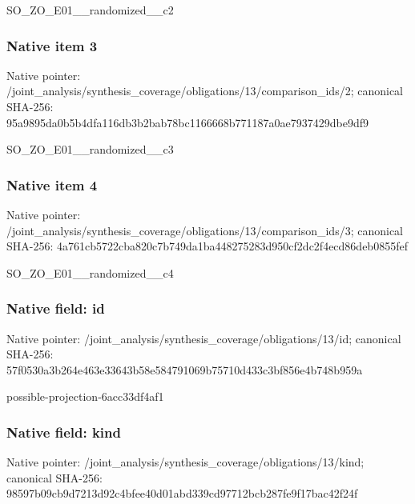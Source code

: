 \documentclass[10pt,a4paper]{article}
\begin{document}
\begingroup\raggedright\sloppy SO\_\allowbreak{}ZO\_\allowbreak{}E01\_\allowbreak{}\_\allowbreak{}randomized\_\allowbreak{}\_\allowbreak{}c2\par\endgroup

\subsubsection{Native item 3}
Native pointer: /joint\_\allowbreak{}analysis/synthesis\_\allowbreak{}coverage/obligations/13/comparison\_\allowbreak{}ids/2; canonical SHA-256: 95a9895da0b5b4dfa116db3b2bab78bc1166668b771187a0ae7937429dbe9df9

\begingroup\raggedright\sloppy SO\_\allowbreak{}ZO\_\allowbreak{}E01\_\allowbreak{}\_\allowbreak{}randomized\_\allowbreak{}\_\allowbreak{}c3\par\endgroup

\subsubsection{Native item 4}
Native pointer: /joint\_\allowbreak{}analysis/synthesis\_\allowbreak{}coverage/obligations/13/comparison\_\allowbreak{}ids/3; canonical SHA-256: 4a761cb5722cba820c7b749da1ba448275283d950cf2dc2f4ecd86deb0855fef

\begingroup\raggedright\sloppy SO\_\allowbreak{}ZO\_\allowbreak{}E01\_\allowbreak{}\_\allowbreak{}randomized\_\allowbreak{}\_\allowbreak{}c4\par\endgroup

\subsubsection{Native field: id}
Native pointer: /joint\_\allowbreak{}analysis/synthesis\_\allowbreak{}coverage/obligations/13/id; canonical SHA-256: 57f0530a3b264e463e33643b58e584791069b75710d433c3bf856e4b748b959a

\begingroup\raggedright\sloppy possible-projection-6acc33df4af1\par\endgroup

\subsubsection{Native field: kind}
Native pointer: /joint\_\allowbreak{}analysis/synthesis\_\allowbreak{}coverage/obligations/13/kind; canonical SHA-256: 98597b09cb9d7213d92c4bfee40d01abd339cd97712bcb287fe9f17bac42f24f
\end{document}
